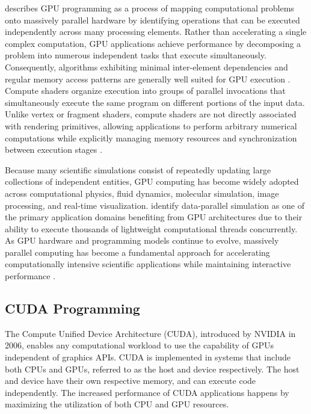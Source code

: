 \citeauthor{HarrisMark2004Mcct} describes GPU programming as a process of mapping computational problems onto massively parallel hardware by identifying operations that can be executed independently across many processing elements.
Rather than accelerating a single complex computation, GPU applications achieve performance by decomposing a problem into numerous independent tasks that execute simultaneously. Consequently, algorithms exhibiting minimal inter-element dependencies and regular memory access patterns are generally well suited for GPU execution \cite{HarrisMark2004Mcct}.
Compute shaders organize execution into groups of parallel invocations that simultaneously execute the same program on different portions of the input data.
Unlike vertex or fragment shaders, compute shaders are not directly associated with rendering primitives, allowing applications to perform arbitrary numerical computations while explicitly managing memory resources and synchronization between execution stages \cite{vulkan14spec2024}.

Because many scientific simulations consist of repeatedly updating large collections of independent entities, GPU computing has become widely adopted across computational physics, fluid dynamics, molecular simulation, image processing, and real-time visualization. \citeauthor{OwensJohnD.2008GC} identify data-parallel simulation as one of the primary application domains benefiting from GPU architectures due to their ability to execute thousands of lightweight computational threads concurrently. As GPU hardware and programming models continue to evolve, massively parallel computing has become a fundamental approach for accelerating computationally intensive scientific applications while maintaining interactive performance \cite{OwensJohnD.2008GC}.

\subsection{CUDA Programming}
The Compute Unified Device Architecture (CUDA), introduced by NVIDIA in 2006, enables any computational workload to use the capability of GPUs independent of graphics APIs. CUDA is implemented in systems that include both CPUs and GPUs, referred to as the host and device respectively. The host and device have their own respective memory, and can execute code independently. The increased performance of CUDA applications happens by maximizing the utilization of both CPU and GPU resources.

